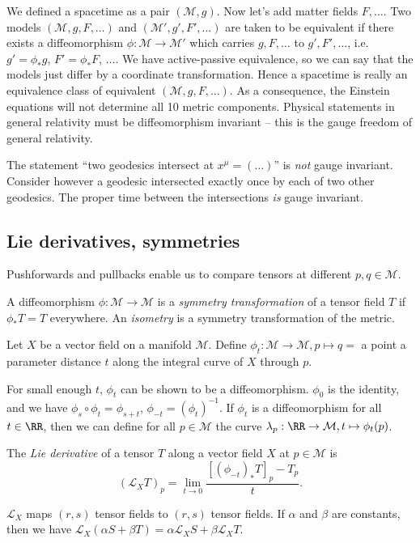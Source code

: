 \documentclass{jknotes}
\begin{document}
We defined a spacetime as a pair \((\mathcal{M},g)\). Now let's add matter fields \(F,\dots\). Two models \((\mathcal{M},g,F,\dots)\) and \((\mathcal{M}',g',F',\dots)\) are taken to be equivalent if there exists a diffeomorphism \(\phi:\mathcal{M}\to\mathcal{M}'\) which carries \(g,F,\dots\) to \(g',F',\dots\), i.e.\ \(g' = \phi_*g\), \(F' = \phi_*F\), \(\dots\). We have active-passive equivalence, so we can say that the models just differ by a coordinate transformation. Hence a spacetime is really an equivalence class of equivalent \((\mathcal{M},g,F,\dots)\). As a consequence, the Einstein equations will not determine all 10 metric components. Physical statements in general relativity must be diffeomorphism invariant -- this is the gauge freedom of general relativity.

\begin{eg}
    The statement ``two geodesics intersect at \(x^\mu = (\dots)\)'' is \emph{not} gauge invariant.
    Consider however a geodesic intersected exactly once by each of two other geodesics. The proper time between the intersections \emph{is} gauge invariant.
\end{eg}

\subsection{Lie derivatives, symmetries}
Pushforwards and pullbacks enable us to compare tensors at different \(p,q \in \mathcal{M}\).
\begin{defn}
    A diffeomorphism \(\phi:\mathcal{M}\to\mathcal{M}\) is a \emph{symmetry transformation} of a tensor field \(T\) if \(\phi_*T=T\) everywhere. An \emph{isometry} is a symmetry transformation of the metric.
\end{defn}

\begin{defn}
    Let \(X\) be a vector field on a manifold \(\mathcal{M}\). Define \(\phi_t:\mathcal{M}\to\mathcal{M}, p\mapsto q = \) a point a parameter distance \(t\) along the integral curve of \(X\) through \(p\). 
\end{defn}
For small enough \(t\), \(\phi_t\) can be shown to be a diffeomorphism.
\(\phi_0\) is the identity, and we have \(\phi_s\circ\phi_t=\phi_{s+t}\), \(\phi_{-t} = (\phi_t)^{-1}\).
If \(\phi_t\) is a diffeomorphism for all \(t\in\RR\), then we can define for all \(p\in\mathcal{M}\) the curve \(\lambda_p:\RR\to\mathcal{M}, t\mapsto\phi_t(p)\).

\begin{defn}
    The \emph{Lie derivative} of a tensor \(T\) along a vector field \(X\) at \(p\in\mathcal{M}\) is 
    \begin{equation}
        (\mathcal{L}_XT)_p = \lim_{t\to0} \frac{[(\phi_{-t})_*T]_p - T_p}{t}.
    \end{equation}
\end{defn}
\(\mathcal{L}_X\) maps \((r,s)\) tensor fields to \((r,s)\) tensor fields. If \(\alpha\) and \(\beta\) are constants, then we have \(\mathcal{L}_X(\alpha S + \beta T) = \alpha\mathcal{L}_XS + \beta\mathcal{L}_XT\).
\end{document}
